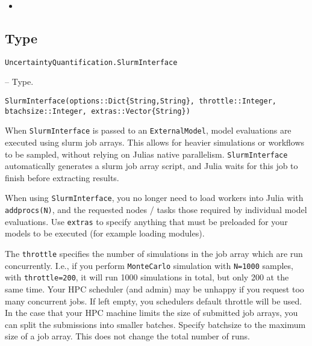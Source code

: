\begin{itemize}
\item {}
\end{itemize}


\subsection{Type}



\label{5754456517017253880}{}

\hypertarget{339239240194958289}{\texttt{UncertaintyQuantification.SlurmInterface}}  -- {Type.}

\begin{adjustwidth}{2em}{0pt}


\begin{verbatim}
SlurmInterface(options::Dict{String,String}, throttle::Integer, btachsize::Integer, extras::Vector{String})
\end{verbatim}

When \texttt{SlurmInterface} is passed to an \texttt{ExternalModel}, model evaluations are executed using slurm job arrays. This allows for heavier simulations or workflows to be sampled, without relying on Julia{\textquotesingle}s native parallelism. \texttt{SlurmInterface} automatically generates a slurm job array script, and Julia waits for this job to finish before extracting results.

When using \texttt{SlurmInterface}, you no longer need to load workers into Julia with \texttt{addprocs(N)}, and the requested nodes / tasks those required by individual model evaluations. Use \texttt{extras} to specify anything that must be preloaded for your models to be executed (for example loading modules).

The \texttt{throttle} specifies the number of simulations in the job array which are run concurrently. I.e., if you perform \texttt{MonteCarlo} simulation with \texttt{N=1000} samples, with \texttt{throttle=200}, it will run 1000 simulations in total, but only 200 at the same time. Your HPC scheduler (and admin) may be unhappy if you request too many concurrent jobs. If left empty, you scheduler{\textquotesingle}s default throttle will be used. In the case that your HPC machine limits the size of submitted job arrays, you can split the submissions into smaller {\textquotedbl}batches{\textquotedbl}. Specify {\textquotedbl}batchsize{\textquotedbl} to the maximum size of a job array. This does not change the total number of runs.


\end{adjustwidth}
